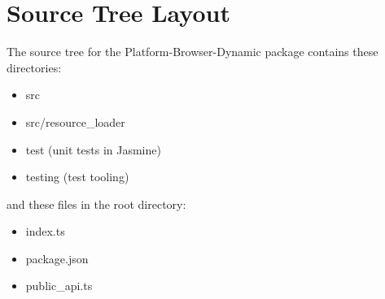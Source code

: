 \section{Source Tree Layout}

The source tree for the Platform-Browser-Dynamic package contains these directories:

\begin{itemize}
  \item src
  \item src/resource\_loader
  \item test (unit tests in Jasmine)
  \item testing (test tooling)
\end{itemize}

and these files in the root directory:

\begin{itemize}
  \item index.ts
  \item package.json
  \item public\_api.ts
\end{itemize}
